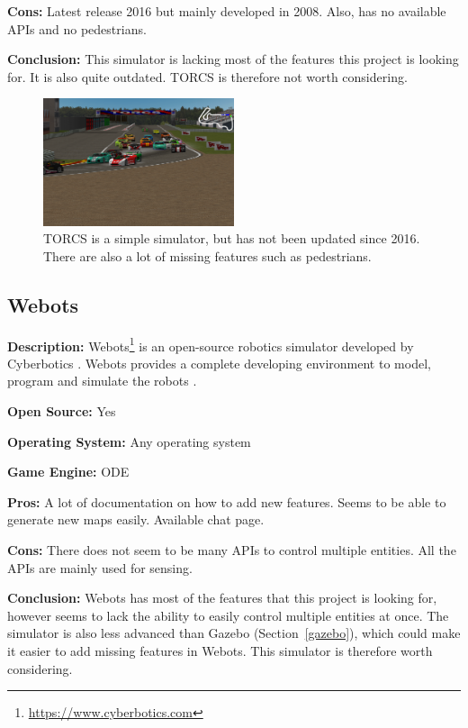 \textbf{Cons:} Latest release 2016 but mainly developed in 2008. Also, has no available APIs and no pedestrians.

\textbf{Conclusion:} This simulator is lacking most of the features this project is looking for. It is also quite outdated. TORCS is therefore not worth considering. 

\begin{figure}[H]
    \centering
    \includegraphics[width=0.5\textwidth]{03_Background/Appendix/Simulators/TORCS.png}
    \caption[The Open Racing Car Simulator]{TORCS is a simple simulator, but has not been updated since 2016. There are also a lot of missing features such as pedestrians.}
\end{figure}

\subsection{Webots}
\textbf{Description:} Webots\footnote{\url{https://www.cyberbotics.com}} is an open-source robotics simulator developed by Cyberbotics \cite{Webots_Github}. Webots provides a complete developing environment to model, program and simulate the robots \cite{Webots_home}. 

\textbf{Open Source:} Yes

\textbf{Operating System:} Any operating system

\textbf{Game Engine:} ODE

\textbf{Pros:} A lot of documentation on how to add new features. Seems to be able to generate new maps easily. Available chat page.

\textbf{Cons:} There does not seem to be many APIs to control multiple entities. All the APIs are mainly used for sensing. 

\textbf{Conclusion:} Webots has most of the features that this project is looking for, however seems to lack the ability to easily control multiple entities at once. The simulator is also less advanced than Gazebo (Section~\ref{gazebo}), which could make it easier to add missing features in Webots. This simulator is therefore worth considering.

